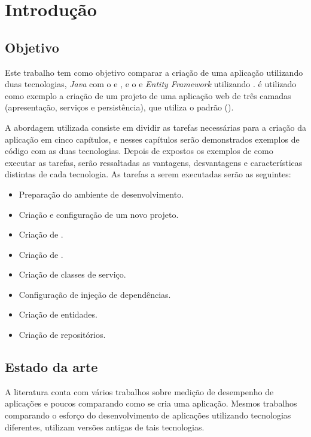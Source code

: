 \chapter{Introdução}
\label{cap:introducao}

\section{Objetivo}
\label{sec:objetivo}

Este trabalho tem como objetivo comparar a criação de uma aplicação utilizando duas tecnologias, \textit{Java} com o  e , e o  e \textit{Entity Framework} utilizando . é utilizado como exemplo a criação de um projeto de uma aplicação web de três camadas (apresentação, serviços e persistência), que utiliza o padrão  ().

A abordagem utilizada consiste em dividir as tarefas necessárias para a criação da aplicação em cinco capítulos, e nesses capítulos serão demonstrados exemplos de código com as duas tecnologias. Depois de expostos os exemplos de como executar as tarefas, serão ressaltadas as vantagens, desvantagens e características distintas de cada tecnologia. As tarefas a serem executadas serão as seguintes:

\begin{itemize}
  \item Preparação do ambiente de desenvolvimento.
  \item Criação e configuração de um novo projeto.
  \item Criação de .
  \item Criação de .
  \item Criação de classes de serviço.
  \item Configuração de injeção de dependências.
  \item Criação de entidades.
  \item Criação de repositórios.
\end{itemize}

\section{Estado da arte}
\label{sec:estadoarte}
 
A literatura conta com vários trabalhos sobre medição de desempenho de aplicações  e poucos comparando como se cria uma aplicação. 
Mesmos trabalhos comparando o esforço do desenvolvimento de aplicações utilizando tecnologias diferentes, utilizam versões antigas de tais tecnologias. 

